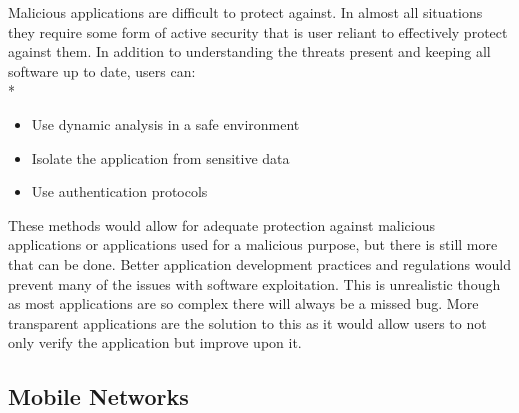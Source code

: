 Malicious applications are difficult to protect against. In almost all situations they require some form of active security that is user reliant to effectively protect against them. In addition to understanding the threats present and keeping all software up to date, users can:\\*
\begin{itemize}
\item Use dynamic analysis in a safe environment
\item Isolate the application from sensitive data
\item Use authentication protocols
\end{itemize}
These methods would allow for adequate protection against malicious applications or applications used for a malicious purpose, but there is still more that can be done. Better application development practices and regulations would prevent many of the issues with software exploitation. This is unrealistic though as most applications are so complex there will always be a missed bug. More transparent applications are the solution to this as it would allow users to not only verify the application but improve upon it.\cite{Reference13}


\subsection{Mobile Networks}

\label{Ch2 Sec2 Sub3}

